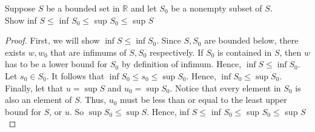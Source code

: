 \documentclass[12pt]{article}
\newcommand{\R}{\mathbb{R}}
\newenvironment{claim}[2][Claim]{\begin{trivlist}
		\item[\hskip \labelsep {\bfseries #1}\hskip \labelsep {\bfseries #2}]}{\end{trivlist}}
\begin{document}
\begin{claim}{2.3.11}
	Suppose $S$ be a bounded set in $\R$ and let $S_0$ be a nonempty subset of $S$.\\Show inf $S \leq$ inf $S_0 \leq$ sup $S_0 \leq$ sup $S$ 
\end{claim}
\begin{proof}
 First, we will show $\inf S \leq \inf S_0$. Since $S,S_0$ are bounded below, there exists $w,w_0$ that are infimums of $S, S_0$ respectively. If $S_0$ is contained in $S$, then $w$ has to be a lower bound for $S_0$ by definition of infimum. Hence, $\inf S \leq \inf S_0$. Let $s_0 \in S_0$. It follows that $\inf S_0 \leq s_0 \leq \sup S_0$. Hence, $\inf S_0 \leq \sup S_0$.
Finally, let that $u = \sup S$ and $u_0 = \sup S_0$. Notice that every element in $S_0$ is also an element of $S$. Thus, $u_0$ must be less than or equal to the least upper bound for $S$, or $u$. So $\sup S_0 \leq \sup S$. Hence, inf $S \leq$ inf $S_0 \leq$ sup $S_0 \leq$ sup $S$ 
\end{proof}
\end{document}
